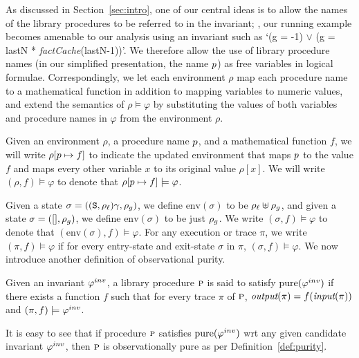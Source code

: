 As discussed in Section~\ref{sec:intro},
one of our central ideas is to allow the names of the library procedures to
be referred to in the invariant; \eg, our running example becomes amenable
to our analysis using an invariant such as `(g = -1) $\vee$ (g = lastN *
\emph{factCache}(lastN-1))'.  We therefore allow the use of library
procedure names (in our simplified presentation, the name $p$) as free variables in
logical formulae. Correspondingly, 
we let each environment $\rho$ map each procedure name to a mathematical
function in addition to mapping variables to numeric values, and extend the
semantics of $\rho \models \varphi$ by substituting the values of both
variables and procedure names in $\varphi$ from the environment $\rho$. 



Given an environment $\rho$, a procedure name $p$, and a mathematical function $f$, we will write
$\rho[p \mapsto f]$ to indicate the updated environment that maps
$p$ to the value $f$ and maps every
other variable $x$ to its original value $\rho[x]$.
We will write $(\rho,f) \models \varphi$ to denote that $\rho[p \mapsto f] \models \varphi$.

Given a state $\sigma = ((\texttt{S},\rho_\ell)\gamma,\rho_g)$, 
we define $\text{env}(\sigma)$ to be $\rho_\ell \uplus \rho_g$,  and given a
state $\sigma = ([],\rho_g)$, we define $\text{env}(\sigma)$ to be just $\rho_g$.
We write $(\sigma,f) \models \varphi$ to denote that $(\text{env}(\sigma),f) \models \varphi$.
For any execution or trace $\pi$, we write $(\pi,f) \models \varphi$ if for every entry-state and exit-state
$\sigma$ in $\pi$, $(\sigma,f) \models \varphi$.
We now introduce another definition of observational purity.
\begin{definition}
\label{def:pureinv}
Given an invariant $\varphi^{inv}$, 
a library procedure $\textsc{p}$ is said to satisfy $\mathrm{pure}(\varphi^{inv})$ if
there exists a function $f$ such that for every trace $\pi$ of $\textsc{p}$,
$\textit{output}(\pi) = f(\textit{input}(\pi))$ and $(\pi,f) \models \varphi^{inv}$.
\end{definition}
It is easy to see that if procedure $\textsc{p}$ satisfies $\mathrm{pure}(\varphi^{inv})$ wrt any
given candidate invariant $\varphi^{inv}$, then $\textsc{p}$ is observationally pure as
per Definition~\ref{def:purity}. 

